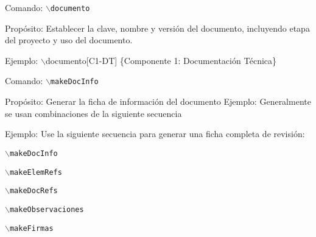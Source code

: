 \begin{Cdescription}
	\item[Comando:] {\tt $\backslash$documento}
	\item[Propósito:] Establecer la clave, nombre y versión del documento, incluyendo etapa del proyecto y uso del documento.
	\item[Ejemplo:] $\backslash$documento[C1-DT] \{Componente 1: Documentación Técnica\}
\end{Cdescription}
%
\begin{Cdescription}
	\item[Comando:] {\tt $\backslash$makeDocInfo}
	\item[Propósito:] Generar la ficha de información del documento
 Ejemplo: Generalmente se usan combinaciones de la siguiente secuencia
	\item[Ejemplo:] Use la siguiente secuencia para generar una ficha completa de revisión:
	\begin{Citemize}
	 	\item {\tt $\backslash$makeDocInfo}
	 	\item {\tt $\backslash$makeElemRefs}
	 	\item {\tt $\backslash$makeDocRefs}
	 	\item {\tt $\backslash$makeObservaciones}
	 	\item {\tt $\backslash$makeFirmas}
	\end{Citemize}
\end{Cdescription}

